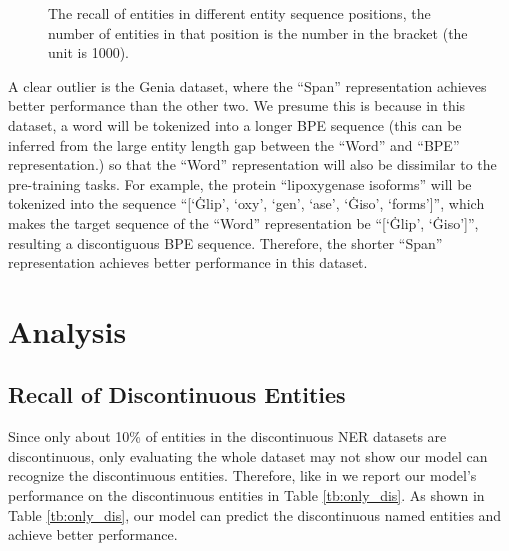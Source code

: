\documentclass[11pt,a4paper]{article}
\begin{document}
\begin{figure*}[!t]
\begin{subfigure}{0.32\textwidth}
  \end{subfigure}
  \caption{The recall of entities in different entity sequence positions, the number of entities in that position is the number in the bracket (the unit is 1000). } \label{fig:entity_order}
\end{figure*}

A clear outlier is the Genia dataset, where the ``Span'' representation achieves better performance than the other two. We presume this is because in this dataset, a word will be tokenized into a longer BPE sequence (this can be inferred from the large entity length gap between the ``Word'' and ``BPE'' representation.) so that the ``Word'' representation will also be dissimilar to the pre-training tasks. For example, the protein ``lipoxygenase isoforms'' will be tokenized into the sequence ``[`Ġlip', `oxy', `gen', `ase', `Ġiso', `forms']'', which makes the target sequence of the ``Word'' representation be ``[`Ġlip', `Ġiso']'', resulting a discontiguous BPE sequence. Therefore, the shorter ``Span'' representation achieves better performance in this dataset.


\section{Analysis}


\subsection{Recall of Discontinuous Entities}
Since only about 10\% of entities in the discontinuous NER datasets are discontinuous, only evaluating the whole dataset may not show our model can recognize the discontinuous entities. Therefore, like in \citet{DBLP:conf/acl/DaiKHP20,DBLP:conf/emnlp/MuisL16} we report our model's performance on the discontinuous entities in Table \ref{tb:only_dis}. As shown in Table \ref{tb:only_dis}, our model can predict the discontinuous named entities and achieve better performance.
\end{document}
